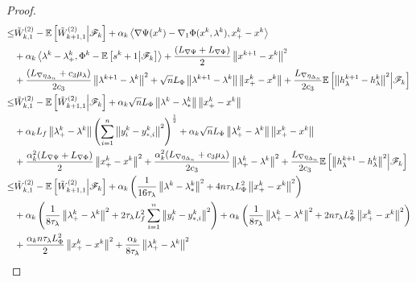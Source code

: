 \documentclass[10pt]{article}
\theoremstyle{remark}
\def\setF{\mathscr{F}} %
\newcommand{\E}{\mathbb{E}}
\newcommand{\norm}[1]{\left\|#1\right\|}
\def\<#1,#2>{\left\langle #1,#2\right\rangle}
\begin{document}
\begin{proof}
\begin{align}
         \leq &\tilde W_{k,1}^{(2)} - \E\left[\tilde W_{k+1,1}^{(2)}\middle|\setF_k\right] + \alpha_k\<\nabla \Psi(x^k) - \nabla_1\Phi(x^k, \lambda^k), x_+^k - x^k>\notag \\
         & + \alpha_k\<\lambda^k - \lambda_+^k, \Phi^k - \E\left[s^{k+1}\middle|\setF_k\right]> + \frac{(L_{\nabla\Psi} + L_{\nabla \Phi})}{2}\norm{x^{k+1} - x^k}^2\notag \\
         & + \frac{(L_{\nabla\eta_{\Delta_n}} +c_3\mu_{\lambda})}{2c_3}\norm{\lambda^{k+1}-\lambda^k}^2 +  \sqrt{n}L_{\Phi}\norm{\lambda^{k+1} - \lambda^k}\norm{x_+^k - x^k} + \frac{L_{\nabla\eta_{\Delta_n}}}{2c_3}\E\left[\norm{h_{\lambda}^{k+1} - h_{\lambda}^k}^2\middle|\setF_k\right]\notag \\
         \leq & \tilde W_{k,1}^{(2)} - \E\left[\tilde W_{k+1,1}^{(2)}\middle|\setF_k\right] + \alpha_k\sqrt{n}L_{\Phi}\norm{\lambda^k-\lambda_*^k}\norm{x_+^k - x^k} \notag\\
         & + \alpha_kL_f\norm{\lambda_+^k - \lambda^k}\left(\sum_{i=1}^{n}\norm{y_i^k-y_{*,i}^k}^2\right)^{\frac{1}{2}} + \alpha_k\sqrt{n}L_{\Phi}\norm{\lambda_+^k - \lambda^k}\norm{x_+^k - x^k} \notag\\
         & + \frac{\alpha_k^2(L_{\nabla\Psi} + L_{\nabla \Phi})}{2}\norm{x_+^k - x^k}^2 + \frac{\alpha_k^2(L_{\nabla\eta_{\Delta_n}} +c_3\mu_{\lambda})}{2c_3}\norm{\lambda_+^k-\lambda^k}^2 + \frac{L_{\nabla\eta_{\Delta_n}}}{2c_3}\E\left[\norm{h_{\lambda}^{k+1} - h_{\lambda}^k}^2\middle|\setF_k\right] \notag\\
         \leq &\tilde W_{k,1}^{(2)} - \E\left[\tilde W_{k+1,1}^{(2)}\middle|\setF_k\right] + \alpha_k\left(\frac{1}{16\tau_{\lambda}}\norm{\lambda^k-\lambda_*^k}^2 + 4n\tau_{\lambda}L_{\Phi}^2\norm{x_+^k - x^k}^2 \right) \notag\\
         & + \alpha_k\left(\frac{1}{8\tau_{\lambda}}\norm{\lambda_+^k - \lambda^k}^2 + 2\tau_{\lambda}L_f^2\sum_{i=1}^{n}\norm{y_i^k-y_{*,i}^k}^2\right) + \alpha_k\left(\frac{1}{8\tau_{\lambda}}\norm{\lambda_+^k - \lambda^k}^2 + 2n\tau_{\lambda}L_{\Phi}^2\norm{x_+^k - x^k}^2\right) \notag\\
         & + \frac{\alpha_kn\tau_{\lambda}L_{\Phi}^2}{2}\norm{x_+^k - x^k}^2 + \frac{\alpha_k}{8\tau_{\lambda}}\norm{\lambda_+^k-\lambda^k}^2 

\end{align}
\end{proof}
\end{document}
